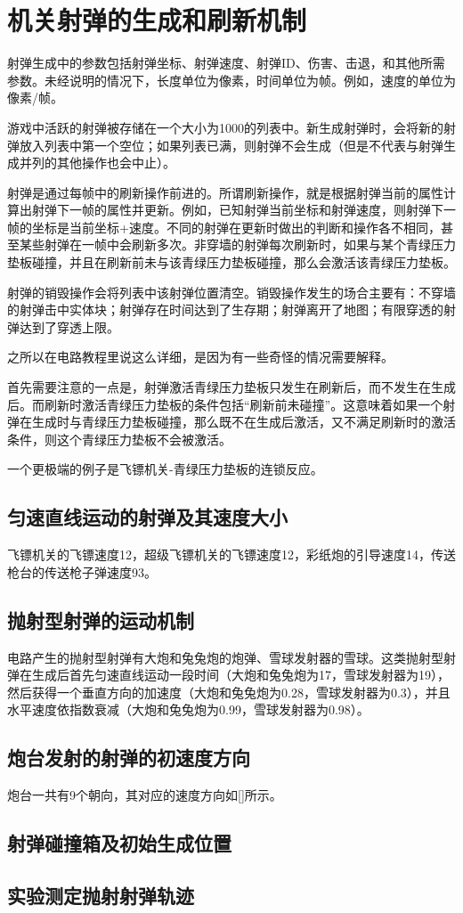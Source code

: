 \chapter{机关射弹的生成和刷新机制}
射弹生成中的参数包括射弹坐标、射弹速度、射弹ID、伤害、击退，和其他所需参数。未经说明的情况下，长度单位为像素，时间单位为帧。例如，速度的单位为像素/帧。

游戏中活跃的射弹被存储在一个大小为1000的列表中。新生成射弹时，会将新的射弹放入列表中第一个空位；如果列表已满，则射弹不会生成（但是不代表与射弹生成并列的其他操作也会中止）。

射弹是通过每帧中的刷新操作前进的。所谓刷新操作，就是根据射弹当前的属性计算出射弹下一帧的属性并更新。例如，已知射弹当前坐标和射弹速度，则射弹下一帧的坐标是当前坐标+速度。不同的射弹在更新时做出的判断和操作各不相同，甚至某些射弹在一帧中会刷新多次。非穿墙的射弹每次刷新时，如果与某个青绿压力垫板碰撞，并且在刷新前未与该青绿压力垫板碰撞，那么会激活该青绿压力垫板。

射弹的销毁操作会将列表中该射弹位置清空。销毁操作发生的场合主要有：不穿墙的射弹击中实体块；射弹存在时间达到了生存期；射弹离开了地图；有限穿透的射弹达到了穿透上限。

之所以在电路教程里说这么详细，是因为有一些奇怪的情况需要解释。

首先需要注意的一点是，射弹激活青绿压力垫板只发生在刷新后，而不发生在生成后。而刷新时激活青绿压力垫板的条件包括“刷新前未碰撞”。这意味着如果一个射弹在生成时与青绿压力垫板碰撞，那么既不在生成后激活，又不满足刷新时的激活条件，则这个青绿压力垫板不会被激活。

一个更极端的例子是飞镖机关-青绿压力垫板的连锁反应。

\section{匀速直线运动的射弹及其速度大小}
飞镖机关的飞镖速度12，超级飞镖机关的飞镖速度12，彩纸炮的引导速度14，传送枪台的传送枪子弹速度93。

\section{抛射型射弹的运动机制}
电路产生的抛射型射弹有大炮和兔兔炮的炮弹、雪球发射器的雪球。这类抛射型射弹在生成后首先匀速直线运动一段时间（大炮和兔兔炮为17，雪球发射器为19），然后获得一个垂直方向的加速度（大炮和兔兔炮为0.28，雪球发射器为0.3），并且水平速度依指数衰减（大炮和兔兔炮为0.99，雪球发射器为0.98）。

\section{炮台发射的射弹的初速度方向}
炮台一共有9个朝向，其对应的速度方向如\autoref{}所示。

\section{射弹碰撞箱及初始生成位置}

\section{实验测定抛射射弹轨迹}